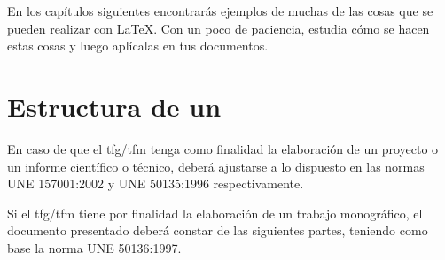 En los capítulos siguientes encontrarás ejemplos de muchas de las cosas que se pueden realizar con \LaTeX. Con un poco de paciencia, estudia cómo se hacen estas cosas y luego aplícalas en tus documentos.


\section{Estructura de un }

En caso de que el \gls{tfg}/\gls{tfm} tenga como finalidad la elaboración de un proyecto o un 
informe científico o técnico, deberá ajustarse a lo dispuesto en las normas UNE 
157001:2002 y UNE 50135:1996 respectivamente.

Si el \gls{tfg}/\gls{tfm} tiene por finalidad la elaboración de un trabajo monográfico, el 
documento presentado deberá constar de las siguientes partes, teniendo como base la 
norma UNE 50136:1997.

